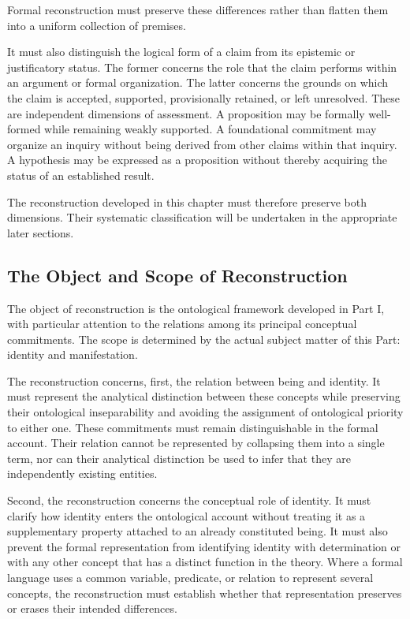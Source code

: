 Formal reconstruction must preserve these differences rather than flatten
them into a uniform collection of premises.

It must also distinguish the logical form of a claim from its epistemic or
justificatory status. The former concerns the role that the claim performs
within an argument or formal organization. The latter concerns the grounds
on which the claim is accepted, supported, provisionally retained, or left
unresolved. These are independent dimensions of assessment. A proposition
may be formally well-formed while remaining weakly supported. A foundational
commitment may organize an inquiry without being derived from other claims
within that inquiry. A hypothesis may be expressed as a proposition without
thereby acquiring the status of an established result.

The reconstruction developed in this chapter must therefore preserve both
dimensions. Their systematic classification will be undertaken in the
appropriate later sections.

\subsection{The Object and Scope of Reconstruction}

The object of reconstruction is the ontological framework developed in
Part I, with particular attention to the relations among its principal
conceptual commitments. The scope is determined by the actual subject matter
of this Part: identity and manifestation.

The reconstruction concerns, first, the relation between being and identity.
It must represent the analytical distinction between these concepts while
preserving their ontological inseparability and avoiding the assignment of
ontological priority to either one. These commitments must remain
distinguishable in the formal account. Their relation cannot be represented
by collapsing them into a single term, nor can their analytical distinction
be used to infer that they are independently existing entities.

Second, the reconstruction concerns the conceptual role of identity. It
must clarify how identity enters the ontological account without treating it
as a supplementary property attached to an already constituted being. It
must also prevent the formal representation from identifying identity with
determination or with any other concept that has a distinct function in the
theory. Where a formal language uses a common variable, predicate, or
relation to represent several concepts, the reconstruction must establish
whether that representation preserves or erases their intended differences.

